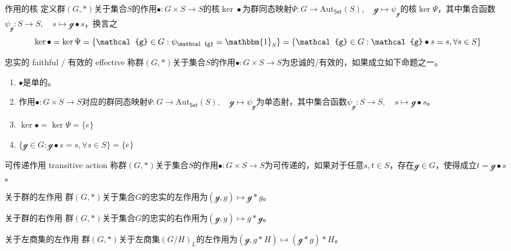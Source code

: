 \begin{definition}{作用的核}
	定义群$(G,*)$关于集合$S$的作用$\bullet:G\times S\to S$的核$\ker\bullet$为群同态映射$\Psi:G\to \mathrm{Aut}_{\mathsf{Set}}(S),\quad \mathcal{g}\mapsto \psi_{\mathcal{g}}$的核$\ker\Psi$，其中集合函数$\psi_{\mathcal{g}}:S\to S,\quad s\mapsto \mathcal{g}\bullet s$，换言之
	$$
	\ker\bullet=\ker\Psi=\{ \mathcal{g}\in G:\psi_{\mathcal{g}}=\mathbbm{1}_S \}=\{ \mathcal{g}\in G:\mathcal{g}\bullet s= s,\forall s\in S \}
	$$
\end{definition}

\begin{definition}{忠实的 faithful / 有效的 effective}
	称群$(G,*)$关于集合$S$的作用$\bullet:G\times S\to S$为忠诚的/有效的，如果成立如下命题之一。
	\begin{enumerate}
		\item $\bullet$是单的。
		\item 作用$\bullet:G\times S\to S$对应的群同态映射$\Psi:G\to \mathrm{Aut}_{\mathsf{Set}}(S),\quad \mathcal{g}\mapsto \psi_{\mathcal{g}}$为单态射，其中集合函数$\psi_{\mathcal{g}}:S\to S,\quad s\mapsto \mathcal{g}\bullet s$。
		\item $\ker\bullet=\ker\Psi=\{e\}$
		\item $\{ \mathcal{g}\in G:\mathcal{g}\bullet s= s,\forall s\in S \}=\{e\}$
	\end{enumerate}
\end{definition}

\begin{definition}{可传递作用 transitive action}
	称群$(G,*)$关于集合$S$的作用$\bullet:G\times S\to S$为可传递的，如果对于任意$s,t\in S$，存在$\mathcal{g}\in G$，使得成立$t=\mathcal{g}\bullet s$。
\end{definition}

\begin{definition}{关于群的左作用}
	群$(G,*)$关于集合$G$的忠实的左作用为$(\mathcal{g},g)\mapsto \mathcal{g}*g$。
\end{definition}

\begin{definition}{关于群的右作用}
	群$(G,*)$关于集合$G$的忠实的右作用为$(\mathcal{g},g)\mapsto g*\mathcal{g}$。
\end{definition}

\begin{definition}{关于左商集的左作用}
	群$(G,*)$关于左商集$(G/H)_L$的左作用为$(\mathcal{g},g*H)\mapsto (\mathcal{g}*g)*H$。
\end{definition}

